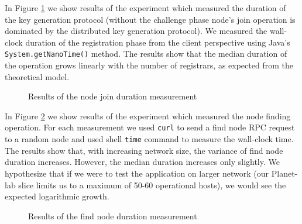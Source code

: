 In Figure \ref{fig:reg_test} we show results of the experiment which measured
the duration of the key generation protocol (without the challenge phase node's
join operation is dominated by the distributed key generation protocol).
We measured the wall-clock duration of the registration phase from the client
perspective using Java's \texttt{System.getNanoTime()} method.
The results show that the median duration of the operation grows linearly with
the number of registrars, as expected from the theoretical model.

\begin{figure}[tbp]
  \centering
\resizebox{\columnwidth}{!}{}
\caption{Results of the node join duration measurement}
\label{fig:reg_test}
\end{figure}

In Figure \ref{fig:fin_test} we show results of the experiment which measured
the node finding operation.
For each measurement we used \texttt{curl} to send a find node RPC request to a
random node and used shell \texttt{time} command to measure the wall-clock time.
The results show that, with increasing network size, the variance of find
node duration increases.
However, the median duration increases only slightly.
We hypothesize that if we were to test the application on larger network (our
Planet-lab slice limits us to a maximum of 50-60 operational hosts), we would
see the expected logarithmic growth.

\begin{figure}[tbp]
  \centering
\resizebox{\columnwidth}{!}{}
\caption{Results of the find node duration measurement}
\label{fig:fin_test}
\end{figure}
